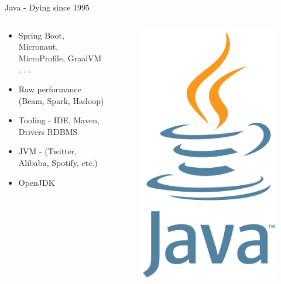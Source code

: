 \documentclass[aspectratio=169]{beamer}
\begin{document}
\begin{frame}{Java - Dying since 1995}
\begin{columns}
\begin{column}{0.5\textwidth}
\begin{itemize}
	\item Spring Boot, Micronaut, MicroProfile, GraalVM . . .
	\item Raw performance (Beam, Spark, Hadoop)
	\item Tooling - IDE, Maven, Drivers RDBMS
	\item JVM - (Twitter, Alibaba, Spotify, etc.)
	\item OpenJDK
\end{itemize}
\end{column}
\begin{column}{0.5\textwidth}  %
\begin{figure}
	\centering
	\includegraphics[width=0.4\linewidth]{Images/java}
\end{figure}
\end{column}
\end{columns}
\end{frame}
\end{document}
